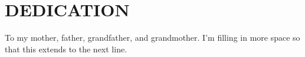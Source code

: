 %
%  
%

\chapter*{DEDICATION}



\begin{center}
\vspace*{\fill}
To my mother, father, grandfather, and grandmother. I'm filling in more space so that this extends to the next line. 
\vspace*{\fill}
\end{center}

\pagebreak{}
